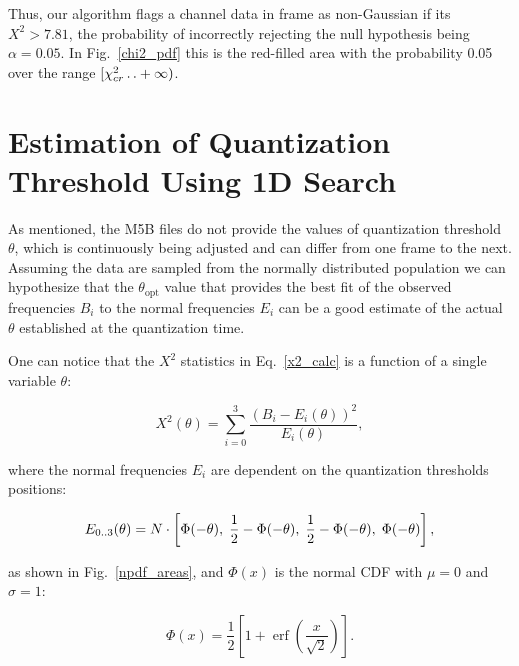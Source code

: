 \documentclass[letterpaper,twoside,12pt]{article}
\newcommand{\twodots}{\mathinner {\ldotp \ldotp}}
\DeclareMathOperator\erf{erf}
\begin{document}
Thus, our algorithm flags a channel data in frame as non-Gaussian if its $X^2 > 7.81$, the probability of incorrectly rejecting the null hypothesis being $\alpha = 0.05$. In Fig.~\ref{chi2_pdf} this is the red-filled area with the probability 0.05 over the range $[\chi^2_{cr} \twodots +\infty)$. 



\section{Estimation of Quantization Threshold Using 1D Search}

As mentioned, the M5B files do not provide the values of quantization threshold $\theta$, which is continuously being adjusted and can differ from one frame to the next. Assuming the data are sampled from the normally distributed population we can hypothesize that the $\theta_{\text{opt}}$ value that provides the best fit of the observed frequencies $B_i$ to the normal frequencies $E_i$ can be a good estimate of the actual $\theta$ established at the quantization time.

One can notice that the $X^2$ statistics in Eq.~\eqref{x2_calc} is a function of a single variable $\theta$: 

\begin{equation}
  \label{x2_func_of_theta}
  X^2(\theta) = \sum_{i=0}^3 \frac{(B_i - E_i(\theta))^2}{E_i(\theta)},
\end{equation}

\noindent where the normal frequencies $E_i$ are dependent on the quantization thresholds positions:

\begin{equation*}
  \label{norm_freq}
  E_{0\twodots3}(\theta) = N \cdot \left[\Phi(-\theta), \; \frac{1}{2}-\Phi(-\theta), \; 
                             \frac{1}{2}-\Phi(-\theta), \; \Phi(-\theta) \right],
\end{equation*}

\noindent as shown in Fig.~\ref{npdf_areas}, and $\Phi(x)$ is the normal CDF with $\mu=0$ and $\sigma=1$:

\begin{equation}
  \label{ncdf}
  \Phi(x) = \frac{1}{2} \left[1 + \erf \left( \frac{x}{\sqrt{2}} \right) \right].
\end{equation}
\end{document}
